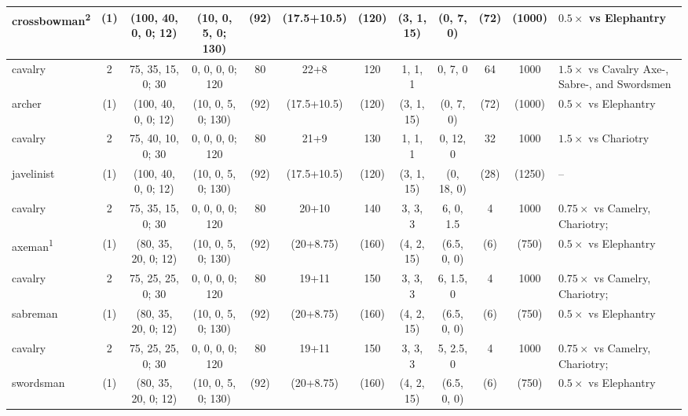 \documentclass{article}
\begin{document}
\begin{landscape}
\begin{tabular}{l|ccc|cccc|ccc|l}
crossbowman\textsuperscript{2}        & (1) & (100,  40,   0, 0; 12) & (10,  0,  5, 0; 130) &  (92) & (17.5+10.5) & (120) &  (3,  1, 15) &  (0,  7,  0) & (72) & (1000) & $0.5\times$ vs Elephantry\\ %
\hline
cavalry                               &  2  &   75,  35,  15, 0; 30  &  0,  0,  0,  0; 120  &   80  &    22+8     &  120  &   1,  1,  1  &   0,  7,  0  &  64  &  1000  & $1.5\times$ vs Cavalry Axe-, Sabre-, and Swordsmen\\
archer                                & (1) & (100,  40,   0, 0; 12) & (10,  0,  5, 0; 130) &  (92) & (17.5+10.5) & (120) &  (3,  1, 15) &  (0,  7,  0) & (72) & (1000) & $0.5\times$ vs Elephantry\\
\hline
cavalry                               &  2  &   75,  40,  10, 0; 30  &  0,  0,  0,  0; 120  &   80  &    21+9     &  130  &   1,  1,  1  &   0, 12,  0  &  32  &  1000  & $1.5\times$ vs Chariotry\\
javelinist                            & (1) & (100,  40,   0, 0; 12) & (10,  0,  5, 0; 130) &  (92) & (17.5+10.5) & (120) &  (3,  1, 15) &  (0, 18,  0) & (28) & (1250) & -- \\
\hline
cavalry                               &  2  &   75,  35,  15, 0; 30  &  0,  0,  0,  0; 120  &   80  &    20+10    &  140  &   3,  3,  3  &  6,  0, 1.5  &   4  &  1000  & $0.75\times$ vs Camelry, Chariotry;\\
axeman\textsuperscript{1}             & (1) &  (80,  35,  20, 0; 12) & (10,  0,  5, 0; 130) &  (92) &   (20+8.75) & (160) &  (4,  2, 15) & (6.5, 0,  0) &  (6) &  (750) & $0.5\times$ vs Elephantry\\
\hline
cavalry                               &  2  &   75,  25,  25, 0; 30  &  0,  0,  0,  0; 120  &   80  &    19+11    &  150  &   3,  3,  3  &  6, 1.5,  0  &   4  &  1000  & $0.75\times$ vs Camelry, Chariotry;\\
sabreman                              & (1) &  (80,  35,  20, 0; 12) & (10,  0,  5, 0; 130) &  (92) &   (20+8.75) & (160) &  (4,  2, 15) & (6.5, 0,  0) &  (6) &  (750) & $0.5\times$ vs Elephantry\\
\hline
cavalry                               &  2  &   75,  25,  25, 0; 30  &  0,  0,  0,  0; 120  &   80  &    19+11    &  150  &   3,  3,  3  &  5, 2.5,  0  &   4  &  1000  & $0.75\times$ vs Camelry, Chariotry;\\
swordsman                             & (1) &  (80,  35,  20, 0; 12) & (10,  0,  5, 0; 130) &  (92) &   (20+8.75) & (160) &  (4,  2, 15) & (6.5, 0,  0) &  (6) &  (750) & $0.5\times$ vs Elephantry\\

\end{tabular}
\end{landscape}
\end{document}
